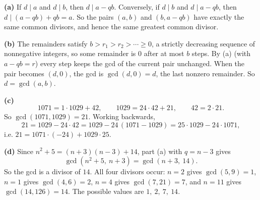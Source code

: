 \textbf{(a)} If $d\mid a$ and $d\mid b$, then $d\mid a-qb$. Conversely, if $d\mid b$ and $d\mid a-qb$, then $d\mid(a-qb)+qb=a$. So the pairs $(a,b)$ and $(b,a-qb)$ have exactly the same common divisors, and hence the same greatest common divisor.

\textbf{(b)} The remainders satisfy $b>r_1>r_2>\cdots\ge0$, a strictly decreasing sequence of nonnegative integers, so some remainder is $0$ after at most $b$ steps. By (a) (with $a-qb=r$) every step keeps the gcd of the current pair unchanged. When the pair becomes $(d,0)$, the gcd is $\gcd(d,0)=d$, the last nonzero remainder. So $d=\gcd(a,b)$.

\textbf{(c)}
\[1071=1\cdot1029+42,\qquad 1029=24\cdot42+21,\qquad 42=2\cdot21.\]
So $\gcd(1071,1029)=21$. Working backwards,
\[21=1029-24\cdot42=1029-24\,(1071-1029)=25\cdot1029-24\cdot1071,\]
i.e. $\boxed{21=1071\cdot(-24)+1029\cdot25}$.

\textbf{(d)} Since $n^2+5=(n+3)(n-3)+14$, part (a) with $q=n-3$ gives
\[\gcd\left(n^2+5,\ n+3\right)=\gcd(n+3,\ 14).\]
So the gcd is a divisor of $14$. All four divisors occur: $n=2$ gives $\gcd(5,9)=1$, $n=1$ gives $\gcd(4,6)=2$, $n=4$ gives $\gcd(7,21)=7$, and $n=11$ gives $\gcd(14,126)=14$. The possible values are $\boxed{1,\ 2,\ 7,\ 14}$.
